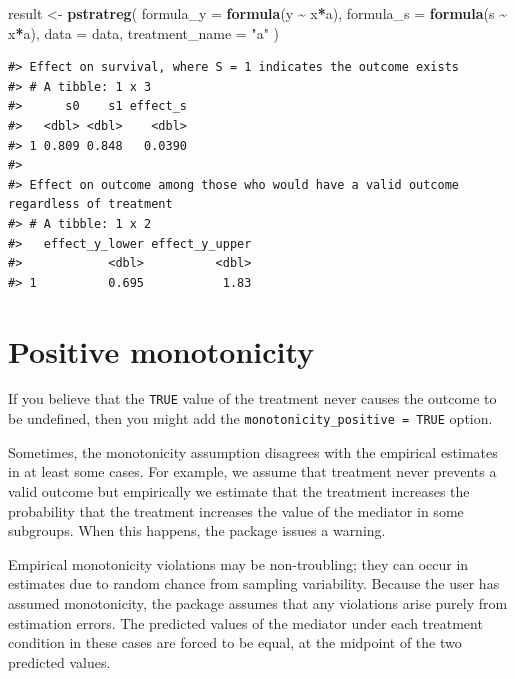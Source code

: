 \documentclass[
]{book}
\newenvironment{Shaded}{\begin{snugshade}}{\end{snugshade}}
\newcommand{\AttributeTok}[1]{\textcolor[rgb]{0.13,0.29,0.53}{#1}}
\newcommand{\FunctionTok}[1]{\textcolor[rgb]{0.13,0.29,0.53}{\textbf{#1}}}
\newcommand{\NormalTok}[1]{#1}
\newcommand{\OtherTok}[1]{\textcolor[rgb]{0.56,0.35,0.01}{#1}}
\newcommand{\SpecialCharTok}[1]{\textcolor[rgb]{0.81,0.36,0.00}{\textbf{#1}}}
\newcommand{\StringTok}[1]{\textcolor[rgb]{0.31,0.60,0.02}{#1}}
\begin{document}
\begin{Shaded}
\begin{Highlighting}[]
\NormalTok{result }\OtherTok{\textless{}{-}} \FunctionTok{pstratreg}\NormalTok{(}
  \AttributeTok{formula\_y =} \FunctionTok{formula}\NormalTok{(y }\SpecialCharTok{\textasciitilde{}}\NormalTok{ x}\SpecialCharTok{*}\NormalTok{a),}
  \AttributeTok{formula\_s =} \FunctionTok{formula}\NormalTok{(s }\SpecialCharTok{\textasciitilde{}}\NormalTok{ x}\SpecialCharTok{*}\NormalTok{a),}
  \AttributeTok{data =}\NormalTok{ data,}
  \AttributeTok{treatment\_name =} \StringTok{"a"}
\NormalTok{)}
\end{Highlighting}
\end{Shaded}

\begin{verbatim}
#> Effect on survival, where S = 1 indicates the outcome exists
#> # A tibble: 1 x 3
#>      s0    s1 effect_s
#>   <dbl> <dbl>    <dbl>
#> 1 0.809 0.848   0.0390
#> 
#> Effect on outcome among those who would have a valid outcome regardless of treatment
#> # A tibble: 1 x 2
#>   effect_y_lower effect_y_upper
#>            <dbl>          <dbl>
#> 1          0.695           1.83
\end{verbatim}

\section{Positive monotonicity}\label{positive-monotonicity}

If you believe that the \texttt{TRUE} value of the treatment never causes the outcome to be undefined, then you might add the \texttt{monotonicity\_positive\ =\ TRUE} option.

Sometimes, the monotonicity assumption disagrees with the empirical estimates in at least some cases. For example, we assume that treatment never prevents a valid outcome but empirically we estimate that the treatment increases the probability that the treatment increases the value of the mediator in some subgroups. When this happens, the package issues a warning.

Empirical monotonicity violations may be non-troubling; they can occur in estimates due to random chance from sampling variability. Because the user has assumed monotonicity, the package assumes that any violations arise purely from estimation errors. The predicted values of the mediator under each treatment condition in these cases are forced to be equal, at the midpoint of the two predicted values.
\end{document}
